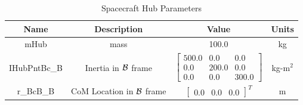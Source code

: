 \begin{table}[htbp]
	\caption{Spacecraft Hub Parameters}
	\label{tab:hub}
	\centering \fontsize{10}{10}\selectfont
	\begin{tabular}{ c | c | c | c } %
		\hline
		\textbf{Name}  & \textbf{Description}  & \textbf{Value} & \textbf{Units} \\
		\hline
		mHub  & mass & 100.0 & kg \\
		IHubPntBc\_B & Inertia in $\cal{B}$ frame & $\begin{bmatrix}
		500.0 & 0.0 & 0.0\\
		0.0 & 200.0 & 0.0\\
		0.0 & 0.0 & 300.0
		\end{bmatrix}$ & kg-m$^2$ \\
		r\_BcB\_B & CoM Location in $\cal{B}$ frame & $\begin{bmatrix}
		0.0 & 0.0 & 0.0 \end{bmatrix}^T$ & m \\
		\hline
	\end{tabular}
\end{table}

